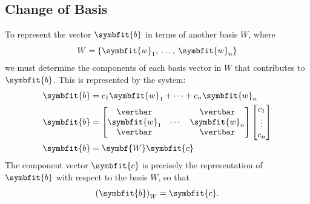 \documentclass{article}
\begin{document}
\subsection{Change of Basis}
To represent the vector \(\symbfit{b}\) in terms of another basis
\(W\), where
\begin{equation*}
    W = \left\{ \symbfit{w}_1,\: \dots,\: \symbfit{w}_n \right\}
\end{equation*}
we must determine the components of each basis vector in \(W\) that
contributes to \(\symbfit{b}\). This is represented by the system:
\begin{align*}
    \symbfit{b} & = c_1 \symbfit{w}_1 + \cdots + c_n \symbfit{w}_n \\
    \symbfit{b} & = \begin{bmatrix}
                        \vertbar      &        & \vertbar      \\
                        \symbfit{w}_1 & \cdots & \symbfit{w}_n \\
                        \vertbar      &        & \vertbar
                    \end{bmatrix} \begin{bmatrix}
                                      c_1    \\
                                      \vdots \\
                                      c_n
                                  \end{bmatrix}         \\
    \symbfit{b} & = \symbf{W} \symbfit{c}
\end{align*}
The component vector \(\symbfit{c}\) is precisely the representation of \(\symbfit{b}\)
with respect to the basis \(W\), so that
\begin{equation*}
    \left( \symbfit{b} \right)_W = \symbfit{c}.
\end{equation*}
\end{document}
